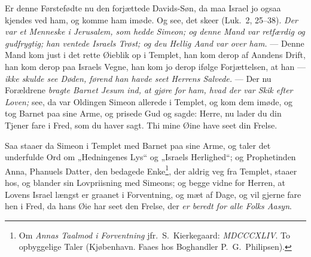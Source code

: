 \documentclass[12pt,a4paper]{book}
\begin{document}
Er denne Førstefødte nu den forjættede Davids-Søn, da maa Israel jo ogsaa
kjendes ved ham, og komme ham imøde. Og see, det skeer (Luk.\ 2, 25--38).
\emph{Der var et Menneske i Jerusalem, som hedde Simeon; og denne Mand var
retfærdig og gudfrygtig; han ventede Israels Trøst; og deu Hellig Aand var over
ham.} --- Denne Mand kom just i det rette Øieblik op i Templet, han kom derop af
Aandens Drift, han kom derop paa Israels Vegne, han kom jo derop ifølge
Forjættelsen, at han --- \emph{ikke skulde see Døden, førend han havde seet
Herrens Salvede.} --- Der nu Forældrene \emph{bragte Barnet Jesum ind, at gjøre
for ham, hvad der var Skik efter Loven;} see, da var Oldingen Simeon allerede i
Templet, og
kom dem imøde, og tog Barnet paa sine Arme, og prisede Gud og sagde: {\large
Herre, nu lader du din Tjener fare i Fred, som du haver sagt. Thi mine Øine have
seet din Frelse.}

Saa staaer da Simeon i Templet med Barnet paa sine Arme, og taler det underfulde
Ord om „Hedningenes Lys“ og „Israels Herlighed“; og Prophetinden Anna, Phanuels
Datter, den bedagede Enke\footnote{%
  Om \emph{Annas Taalmod i Forventning} jfr.\ S.\ Kierkegaard: \textit{MDCCCXLIV}.
  To opbyggelige Taler (Kjøbenhavn. Faaes hos Boghandler P.\ G.\ Philipsen).%
}, der aldrig veg fra Templet, staaer hos, og blander sin Lovpriisning med
Simeons; og begge vidne for Herren, at Lovens Israel længst er graanet i
Forventning, og mæt af Dage, og vil gjerne fare hen i Fred, da hans Øie har seet
den Frelse, der \emph{er beredt for alle Folks Aasyn}.
\end{document}

